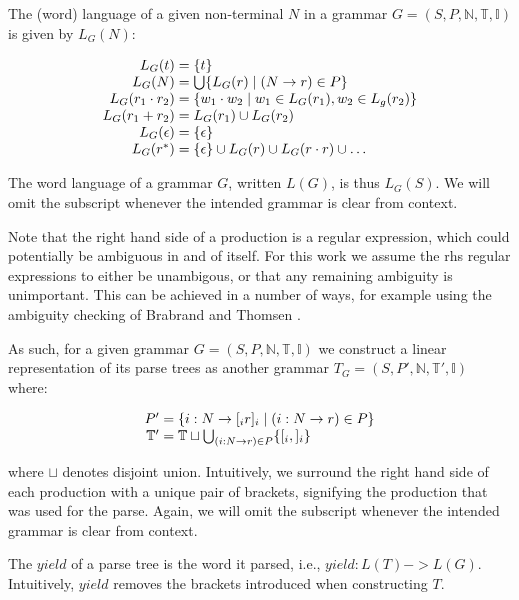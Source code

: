 \documentclass[sigplan]{acmart}\settopmatter{printfolios=true,printccs=false,printacmref=false}
\newcommand{\NT}{\mathbb{N}} %
\newcommand{\T}{\mathbb{T}} %
\newcommand{\I}{\mathbb{I}} %
\newcommand{\yield}{\mathit{yield}} %
\begin{document}
The (word) language of a given non-terminal $N$ in a grammar $G = (S, P, \NT, \T, \I)$ is given by $L_G(N)$:

$$
\begin{array}{r@{\;=\;}l}
  L_G(t) & \{t\} \\
  L_G(N) & \bigcup \{L_G(r) \mid (N -> r) \in P\} \\
  L_G(r_1 \cdot r_2) & \{w_1 \cdot w_2 \mid w_1 \in L_G(r_1), w_2 \in L_g(r_2)\} \\
  L_G(r_1 + r_2) & L_G(r_1) \cup L_G(r_2) \\
  L_G(\epsilon) & \{\epsilon\} \\
  L_G(r^{*}) & \{\epsilon\} \cup L_G(r) \cup L_G(r \cdot r) \cup \ldots \\
\end{array}
$$

\noindent The word language of a grammar $G$, written $L(G)$, is thus $L_G(S)$. We will omit the subscript whenever the intended grammar is clear from context.

Note that the right hand side of a production is a regular expression, which could potentially be ambiguous in and of itself. For this work we assume the rhs regular expressions to either be unambigous, or that any remaining ambiguity is unimportant. This can be achieved in a number of ways, for example using the ambiguity checking of Brabrand and Thomsen \cite{brabrandTypedUnambiguousPattern2010}.

As such, for a given grammar $G = (S, P, \NT, \T, \I)$ we construct a linear representation of its parse trees as another grammar $T_G = (S, P', \NT, \T', \I)$ where:

$$
\begin{array}{r@{\;=\;}l}
  P' & \{i : N -> [_i r ]_i \mid (i : N -> r) \in P \} \\
  \T' & \T \sqcup \bigcup_{(i : N -> r) \in P} \{[_i, ]_i \} \\
\end{array}
$$

\noindent where $\sqcup$ denotes disjoint union. Intuitively, we surround the right hand side of each production with a unique pair of brackets, signifying the production that was used for the parse. Again, we will omit the subscript whenever the intended grammar is clear from context.

The $\yield$ of a parse tree is the word it parsed, i.e., $\yield : L(T) -> L(G)$. Intuitively, $\yield$ removes the brackets introduced when constructing $T$.
\end{document}
